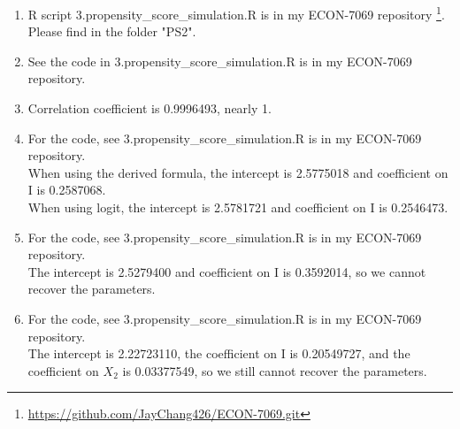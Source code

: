 \documentclass[12pt]{article}
\begin{document}
\begin{enumerate}
      \item R script 3.propensity\_score\_simulation.R is in my ECON-7069 repository \footnote{\url{https://github.com/JayChang426/ECON-7069.git}}.
            Please find in the folder "PS2".
      \item See the code in 3.propensity\_score\_simulation.R is in my ECON-7069 repository.
      \item Correlation coefficient is 0.9996493, nearly 1.
      \item For the code, see 3.propensity\_score\_simulation.R is in my ECON-7069 repository. \\ 
            When using the derived formula, the intercept is 2.5775018 and coefficient on I is 0.2587068. \\ 
            When using logit, the intercept is 2.5781721 and coefficient on I is 0.2546473.
      \item For the code, see 3.propensity\_score\_simulation.R is in my ECON-7069 repository. \\ 
            The intercept is 2.5279400 and coefficient on I is 0.3592014, so we cannot recover the parameters.
      \item For the code, see 3.propensity\_score\_simulation.R is in my ECON-7069 repository. \\ 
            The intercept is 2.22723110, the coefficient on I is 0.20549727, and the coefficient on $X_2$ is 0.03377549, so we still cannot recover the parameters.
\end{enumerate}
\end{document}
